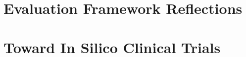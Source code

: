 \section{Evaluation Framework Reflections}
\label{sec:disc-framework-design}

\section{Toward In Silico Clinical Trials}
\label{sec:disc-silico}
